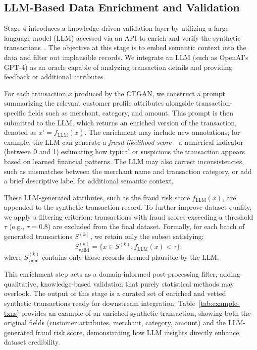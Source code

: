 \documentclass[conference]{IEEEtran}
\begin{document}
\subsection{LLM-Based Data Enrichment and Validation} 
Stage 4 introduces a knowledge-driven validation layer by utilizing a large language model (LLM) accessed via an API to enrich and verify the synthetic transactions~\cite{brown2020}. The objective at this stage is to embed semantic context into the data and filter out implausible records. We integrate an LLM (such as OpenAI's GPT-4) as an oracle capable of analyzing transaction details and providing feedback or additional attributes.

For each transaction \( x \) produced by the CTGAN, we construct a prompt summarizing the relevant customer profile attributes alongside transaction-specific fields such as merchant, category, and amount. This prompt is then submitted to the LLM, which returns an enriched version of the transaction, denoted as \( x' = f_{\text{LLM}}(x) \). The enrichment may include new annotations; for example, the LLM can generate a \textit{fraud likelihood score}—a numerical indicator (between 0 and 1) estimating how typical or suspicious the transaction appears based on learned financial patterns. The LLM may also correct inconsistencies, such as mismatches between the merchant name and transaction category, or add a brief descriptive label for additional semantic context.

These LLM-generated attributes, such as the fraud risk score \( f_{\text{LLM}}(x) \), are appended to the synthetic transaction record. To further improve dataset quality, we apply a filtering criterion: transactions with fraud scores exceeding a threshold \( \tau \) (e.g., \( \tau = 0.8 \)) are excluded from the final dataset. Formally, for each batch of generated transactions \( S^{(k)} \), we retain only the subset satisfying:
\begin{equation}
S_{\text{valid}}^{(k)} = \{ x \in S^{(k)} : f_{\text{LLM}}(x) < \tau \},
\label{eq:llm-filter}
\end{equation}
where \( S_{\text{valid}}^{(k)} \) contains only those records deemed plausible by the LLM.

This enrichment step acts as a domain-informed post-processing filter, adding qualitative, knowledge-based validation that purely statistical methods may overlook. The output of this stage is a curated set of enriched and vetted synthetic transactions ready for downstream integration. Table~\ref{tab:example-txns} provides an example of an enriched synthetic transaction, showing both the original fields (customer attributes, merchant, category, amount) and the LLM-generated fraud risk score, demonstrating how LLM insights directly enhance dataset credibility.
\end{document}
